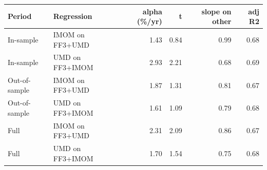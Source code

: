 \begin{tabular}{llrrrr}
\toprule
Period & Regression & alpha (\%/yr) & t & slope on other & adj R2 \\
\midrule
In-sample & IMOM on FF3+UMD & 1.43 & 0.84 & 0.99 & 0.68 \\
In-sample & UMD on FF3+IMOM & 2.93 & 2.21 & 0.68 & 0.69 \\
Out-of-sample & IMOM on FF3+UMD & 1.87 & 1.31 & 0.81 & 0.67 \\
Out-of-sample & UMD on FF3+IMOM & 1.61 & 1.09 & 0.79 & 0.68 \\
Full & IMOM on FF3+UMD & 2.31 & 2.09 & 0.86 & 0.67 \\
Full & UMD on FF3+IMOM & 1.70 & 1.54 & 0.75 & 0.68 \\
\bottomrule
\end{tabular}
